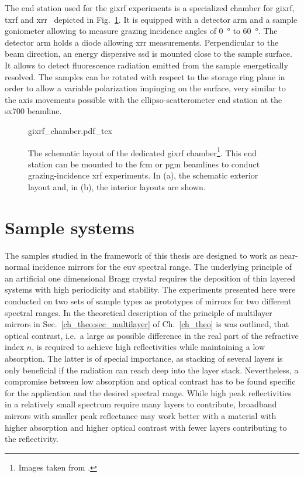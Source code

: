 The end station used for the \gls{gixrf} experiments is a specialized chamber for \gls{gixrf}, \gls{txrf} and \gls{xrr}~\cite{lubeck_novel_2013} depicted in Fig.~\ref{ch_exp:fig_gixrf_chamber}. It is equipped with a detector arm and a sample goniometer allowing to measure grazing incidence angles of \SI{0}{\degree} to \SI{60}{\degree}. The detector arm holds a diode allowing \gls{xrr} measurements. Perpendicular to the beam direction, an energy dispersive \gls{ssd} is mounted close to the sample surface. It allows to detect fluorescence radiation emitted from the sample energetically resolved. The samples can be rotated with respect to the storage ring plane in order to allow a variable polarization impinging on the surface, very similar to the axis movements possible with the ellipso-scatterometer end station at the \gls{sx700} beamline.



\begin{figure}[htb]
    \def\svgwidth{\textwidth}
    {gixrf_chamber.pdf_tex}
    \caption[The GIXRF chamber.]{The schematic layout of the dedicated \gls{gixrf} chamber\footnote{Images taken from \textcite{lubeck_novel_2013}.}. This end station can be mounted to the \gls{fcm} or \gls{pgm} beamlines to conduct grazing-incidence \gls{xrf} experiments. In (a), the schematic exterior layout and, in (b), the interior layouts are shown.}
    \label{ch_exp:fig_gixrf_chamber}
\end{figure}

\section{Sample systems}
The samples studied in the framework of this thesis are designed to work as near-normal incidence mirrors for the \gls{euv} spectral range. The underlying principle of an artificial one dimensional Bragg crystal requires the deposition of thin layered systems with high periodicity and stability. The experiments presented here were conducted on two sets of sample types as prototypes of mirrors for two different spectral ranges. In the theoretical description of the principle of multilayer mirrors in Sec.~\ref{ch_theo:sec_multilayer} of Ch.~\ref{ch_theo} is was outlined, that optical contrast, i.e.~a large as possible difference in the real part of the refractive index $n$, is required to achieve high reflectivities while maintaining a low absorption. The latter is of special importance, as stacking of several layers is only beneficial if the radiation can reach deep into the layer stack. Nevertheless, a compromise between low absorption and optical contrast has to be found specific for the application and the desired spectral range. While high peak reflectivities in a relatively small spectrum require many layers to contribute, broadband mirrors with smaller peak reflectance may work better with a material with higher absorption and higher optical contrast with fewer layers contributing to the reflectivity.


